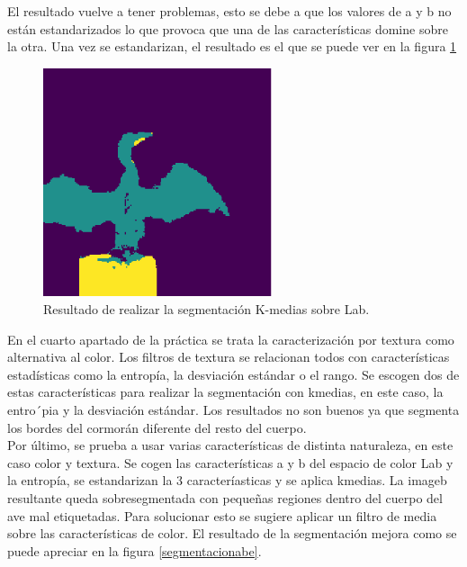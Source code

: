 \documentclass[a4paper,12pt]{report}
\begin{document}
El resultado vuelve a tener problemas, esto se debe a que los valores de a y b no están estandarizados lo que provoca que una de las características domine sobre la otra. Una vez se estandarizan, el resultado es el que se puede ver en la figura \ref{segmentacionlab}\\


\begin{figure}[h]
\centering
\includegraphics[width=0.6\textwidth]{imagenes/segmentacionlab}
\caption{Resultado de realizar la segmentación K-medias sobre Lab.}
\label{segmentacionlab}
\end{figure}

En el cuarto apartado de la práctica se trata la caracterización por textura como alternativa al color. Los filtros de textura se relacionan todos con características estadísticas como la entropía, la desviación estándar o el rango. Se escogen dos de estas características para realizar la segmentación con kmedias, en este caso, la entro´pia y la desviación estándar. Los resultados no son buenos ya que segmenta los bordes del cormorán diferente del resto del cuerpo.\\

Por último, se prueba a usar varias características de distinta naturaleza, en este caso color y textura. Se cogen las características a y b del espacio de color Lab y la entropía, se estandarizan la 3 caracteríasticas y se aplica kmedias. La imageb resultante queda sobresegmentada con pequeñas regiones dentro del cuerpo del ave mal etiquetadas. Para solucionar esto se sugiere aplicar un filtro de media sobre las características de color. El resultado de la segmentación mejora como se puede apreciar en la figura \ref{segmentacionabe}. 
\end{document}
